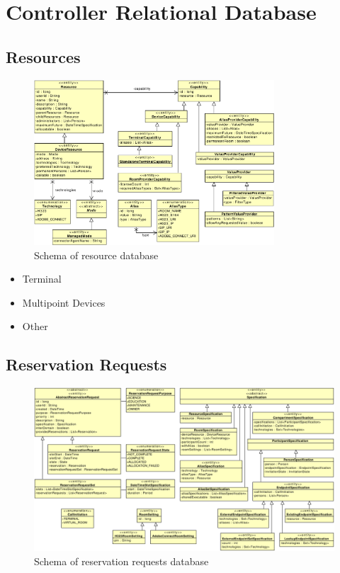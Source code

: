 \chapter{Controller Relational Database} 

\section{Resources}

\begin{figure}[ht!]
\centering\includegraphics[width=0.8\textwidth]{diagrams/cd_resources}
\caption{Schema of resource database}
\label{fig:resources}
\end{figure}

\begin{itemize}
\item Terminal
\item Multipoint Devices
\item Other
\end{itemize}

\section{Reservation Requests}

\begin{figure}[ht!]
\includegraphics[width=\textwidth]{diagrams/cd_reservation_requests}
\caption{Schema of reservation requests database}
\label{fig:resources}
\end{figure}


